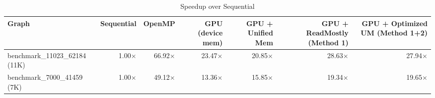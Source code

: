 \begin{table}[h]
\centering
\caption{Speedup over Sequential}
\label{tab:speedup_vs_Sequential}
\begin{tabular}{lrrrrrr}
\hline
Graph & Sequential & OpenMP & GPU (device mem) & GPU + Unified Mem & GPU + ReadMostly (Method 1) & GPU + Optimized UM (Method 1+2) \\
\hline
benchmark_11023_62184 (11K) & 1.00$\times$ & 66.92$\times$ & 23.47$\times$ & 20.85$\times$ & 28.63$\times$ & 27.94$\times$ \\
benchmark_7000_41459 (7K) & 1.00$\times$ & 49.12$\times$ & 13.36$\times$ & 15.85$\times$ & 19.34$\times$ & 19.65$\times$ \\
\hline
\end{tabular}
\end{table}
